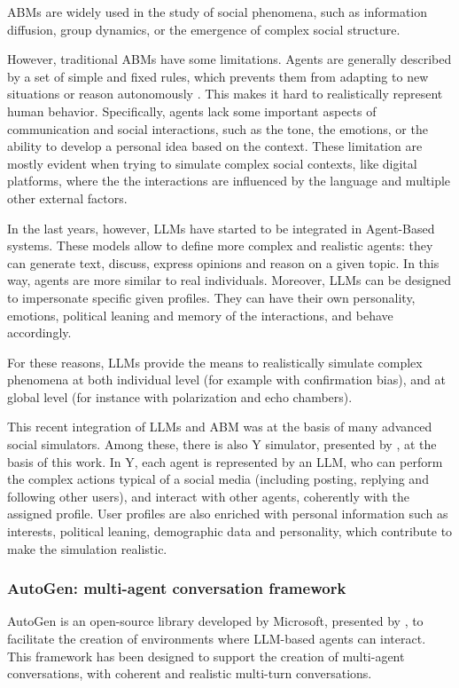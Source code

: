 ABMs are widely used in the study of social phenomena, such as information diffusion, group dynamics, or the emergence of complex social structure.

\medskip
However, traditional ABMs have some limitations.
Agents are generally described by a set of simple and fixed rules, which prevents them from adapting to new situations or reason autonomously \cite{conte2014agent, törnberg2023evaluate}.
This makes it hard to realistically represent human behavior. Specifically, agents lack some important aspects of communication and social interactions, such as the tone, the emotions, or the ability to develop a personal idea based on the context.
These limitation are mostly evident when trying to simulate complex social contexts, like digital platforms, where the the interactions are influenced by the language and multiple other external factors.

\medskip
In the last years, however, LLMs have started to be integrated in Agent-Based systems.
These models allow to define more complex and realistic agents: they can generate text, discuss, express opinions and reason on a given topic. 
In this way, agents are more similar to real individuals.
Moreover, LLMs can be designed to impersonate specific given profiles. They can have their own personality, emotions, political leaning and memory of the interactions, and behave accordingly.

For these reasons, LLMs provide the means to realistically simulate complex phenomena at both individual level (for example with confirmation bias), and at global level (for instance with polarization and echo chambers).

\medskip
This recent integration of LLMs and ABM was at the basis of many advanced social simulators.
Among these, there is also Y simulator, presented by \citet{rossetti2024ysocialllmpoweredsocial}, at the basis of this work.
In Y, each agent is represented by an LLM, who can perform the complex actions typical of a social media (including posting, replying and following other users), and interact with other agents, coherently with the assigned profile.
User profiles are also enriched with personal information such as interests, political leaning, demographic data and personality, which contribute to make the simulation realistic.


\subsubsection{AutoGen: multi-agent conversation framework}
AutoGen is an open-source library developed by Microsoft, presented by \citet{wu2023autogenenablingnextgenllm}, to facilitate the creation of environments where LLM-based agents can interact.
This framework has been designed to support the creation of multi-agent conversations, with coherent and realistic multi-turn conversations. 

